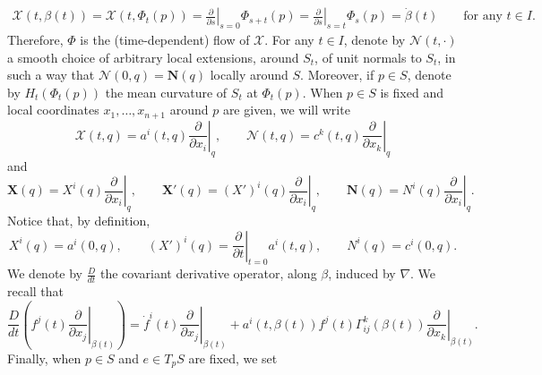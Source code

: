 \documentclass[11pt]{amsart}
\newcommand{\n}[1]{\nabla^\varepsilon_{ #1 }}
\newcommand{\Y}{\mathcal X}
\newcommand{\N}{\mathcal N}
\newcommand{\X}{\mathbf{X}}
\newcommand{\Z}{\mathbf{Z}}
\renewcommand{\n}{\mathbf{N}}
\theoremstyle{definition}
\theoremstyle{remark}
\numberwithin{equation}{section}
\begin{document}
\begin{equation*}\label{xtempodefinisceflusso}
    \begin{split}
        \Y(t,\beta(t))=\Y(t,\Phi_t(p))=\left.\frac{\partial}{\partial s}\right|_{s=0}\Phi_{s+t}(p)=\left.\frac{\partial}{\partial s}\right|_{s=t}\Phi_{s}(p)=\dot\beta(t)\qquad\text{for any $t\in I$}.
    \end{split}
\end{equation*}
Therefore, $\Phi$ is the (time-dependent) flow of $\Y$. 
For any $t\in I$, denote by $\N(t,\cdot)$ a smooth choice of arbitrary local extensions, around $S_t$, of unit normals to $S_t$, in such a way that $\N(0,q)=\n(q)$ locally around $S$. Moreover, if $p\in S$, denote by $H_t\left(\Phi_t(p)\right)$ the mean curvature of $S_t$ at $\Phi_t(p)$. When $p\in S$ is fixed and local coordinates $x_1,\ldots,x_{n+1}$ around $p$ are given, we will write 
  \begin{equation*}
        \Y(t,q)=a^i(t,q)\left.\frac{\partial}{\partial x_i}\right|_{q},\qquad \N(t,q)=c^k(t,q)\left.\frac{\partial}{\partial x_k}\right|_{q}
    \end{equation*}
    and \begin{equation*}
        \X(q)=X^i(q)\left.\frac{\partial}{\partial x_i}\right|_{q},\qquad \X'(q)=\left(X'\right)^i(q)\left.\frac{\partial}{\partial x_i}\right|_{q},\qquad \n(q)=N^i(q)\left.\frac{\partial}{\partial x_i}\right|_{q}.
    \end{equation*}
    Notice that, by definition,
    \begin{equation*}
        X^i(q)=a^i(0,q),\qquad(X')^i(q)=\left.\frac{\partial }{\partial t}\right|_{t=0}a^i(t,q),\qquad N^i(q)=c^i(0,q).
    \end{equation*}
    We denote by $\frac{D}{dt}$ the covariant derivative operator, along $\beta$, induced by $\nabla$. We recall that
\begin{equation}\label{comefarecovdev}
    \frac{D}{dt}\left(\left.f^j(t)\frac{\partial}{\partial x_j}\right|_{\beta(t)}\right)=\dot f^i(t)\left.\frac{\partial}{\partial x_j}\right|_{\beta(t)}+a^i(t,\beta(t))f^j(t)\Gamma_{ij}^k(\beta(t))\left.\frac{\partial}{\partial x_k}\right|_{\beta(t)}.
\end{equation}
  Finally, when $p\in S$ and $e\in T_p S$ are fixed, we set  
\end{document}
